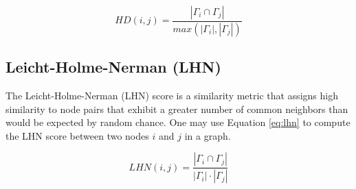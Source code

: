 \begin{equation}
\label{eq:hd}
  HD(i, j) = \frac{|\Gamma_i \cap \Gamma_j|}{max(|\Gamma_i|, |\Gamma_j|)}
\end{equation}




\subsection{Leicht-Holme-Nerman (LHN)}

The Leicht-Holme-Nerman (LHN) score \cite{leicht2006vertex} is a similarity metric that assigns high similarity to node pairs that exhibit a greater number of common neighbors than would be expected by random chance. One may use Equation \ref{eq:lhn} to compute the LHN score between two nodes $i$ and $j$ in a graph.

\begin{equation}
\label{eq:lhn}
  LHN(i, j) = \frac{|\Gamma_i \cap \Gamma_j|}{|\Gamma_i| \cdot |\Gamma_j|}
\end{equation}
